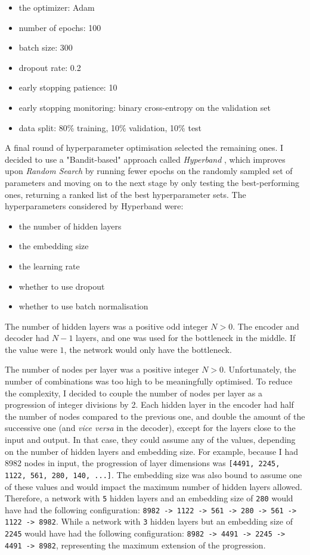 \begin{itemize}
  \item the optimizer: Adam
  \item number of epochs: 100
  \item batch size: 300
  \item dropout rate: 0.2
  \item early stopping patience: 10
  \item early stopping monitoring: binary cross-entropy on the validation set
  \item data split: 80\% training, 10\% validation, 10\% test
\end{itemize}

A final round of hyperparameter optimisation selected the remaining ones.
I decided to use a "Bandit-based" approach
called \textit{Hyperband} \cite{DBLP:journals/corr/LiJDRT16}, which improves upon \textit{Random Search}
by running fewer epochs on the randomly sampled set of parameters
and moving on to the next stage by only testing the best-performing ones, returning a ranked list of the best hyperparameter sets.
The hyperparameters considered by Hyperband were:

\begin{itemize}
  \item the number of hidden layers
  \item the embedding size
  \item the learning rate
  \item whether to use dropout
  \item whether to use batch normalisation
\end{itemize}

The number of hidden layers was a positive odd integer $N > 0$.
The encoder and decoder had $N-1$ layers, and one was used for the bottleneck in the middle.
If the value were $1$, the network would only have the bottleneck.

The number of nodes per layer was a positive integer $N > 0$. Unfortunately, the number of combinations was too high to be
meaningfully optimised. To reduce the complexity, I decided to couple the number of nodes per layer as a progression
of integer divisions by 2.
Each hidden layer in the encoder had half the number of nodes compared to the previous one, and double the amount of the successive one
(and \textit{vice versa} in the decoder), except for the layers close to the input and output.
In that case, they could assume any of the values, depending on the number of hidden layers and embedding size.
For example, because I had 8982 nodes in input, the progression of layer dimensions
was \verb|[4491, 2245, 1122, 561, 280, 140, ...]|.
The embedding size was also bound to assume one of these values and would impact
the maximum number of hidden layers allowed.
Therefore, a network with \verb|5| hidden layers and an embedding size of \verb|280|
would have had the following configuration: \verb|8982 -> 1122 -> 561 -> 280 -> 561 -> 1122 -> 8982|.
While a network with \verb|3| hidden layers but an embedding size of \verb|2245| would have had the following configuration:
\verb|8982 -> 4491 -> 2245 -> 4491 -> 8982|, representing the maximum extension of the progression.

